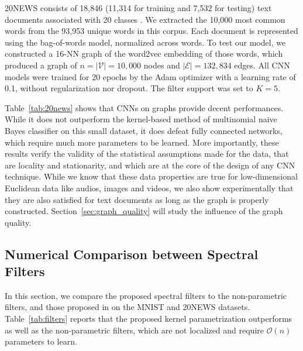\documentclass{article}
\newcommand{\V}{\mathcal{V}}
\newcommand{\E}{\mathcal{E}}
\newcommand{\bO}{\mathcal{O}}
\newcommand{\tabref}[1]{Table~\ref{tab:#1}}
\newcommand{\secref}[1]{Section~\ref{sec:#1}}
\newcommand{\bruna}{art:BrunaZarembaSzlamLeCun13DLgraphs,
art:HenaffBrunaLeCun15DLgraphs}
\begin{document}
20NEWS consists of 18,846 (11,314 for training and 7,532 for testing) text
documents associated with 20 classes \cite{art:Joachims9620NEWS}. We extracted
the 10,000 most common words from the 93,953 unique words in this corpus. Each
document is represented using the bag-of-words model, normalized across words.
To test our model, we constructed a 16-NN graph of the word2vec
\cite{pro:MikolovChenCorradoDean13word2vec} embedding of those words, which
produced a graph of $n = |\V| = 10,000$ nodes and
$|\E| = 132,834$ edges.  All CNN models were trained for 20 epochs by the Adam
optimizer \cite{art:KingmaBa14AdamOpt} with a learning rate of 0.1, without regularization nor
dropout. The filter support was set to $K = 5$.


\tabref{20news} shows that CNNs on graphs provide decent performances. While it does not outperform the kernel-based method of multinomial naive Bayes classifier on this small dataset, it does defeat fully connected networks, which require much more parameters to be learned. More importantly, these results verify the validity of the statistical assumptions made for the data, that are locality and stationarity, and which are at the core of the design of any CNN technique. While we know that these data properties are true for low-dimensional Euclidean data like audios, images and videos, we also show experimentally that they are also satisfied for text documents as long as the graph is properly constructed. \secref{graph_quality} will study the influence of the graph quality. 










\subsection{Numerical Comparison between Spectral Filters}

In this section, we compare the proposed spectral filters to the non-parametric filters, and those proposed in \cite{\bruna} on the MNIST and 20NEWS datasets. \tabref{filters} reports that the proposed kernel parametrization outperforms
\cite{\bruna} as well as the non-parametric filters, which are not localized and require $\bO(n)$ parameters to learn.
\end{document}
